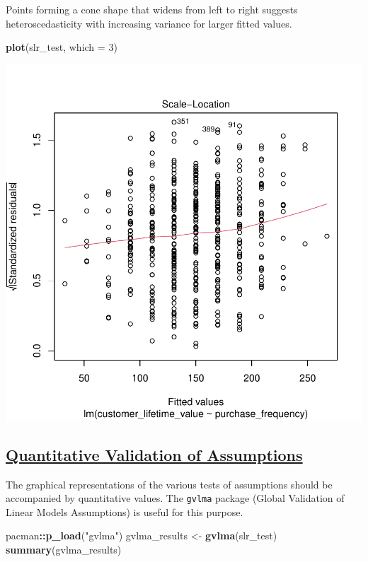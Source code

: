 \documentclass[
]{article}
\newenvironment{Shaded}{\begin{snugshade}}{\end{snugshade}}
\newcommand{\AttributeTok}[1]{\textcolor[rgb]{0.13,0.29,0.53}{#1}}
\newcommand{\DecValTok}[1]{\textcolor[rgb]{0.00,0.00,0.81}{#1}}
\newcommand{\FunctionTok}[1]{\textcolor[rgb]{0.13,0.29,0.53}{\textbf{#1}}}
\newcommand{\NormalTok}[1]{#1}
\newcommand{\OtherTok}[1]{\textcolor[rgb]{0.56,0.35,0.01}{#1}}
\newcommand{\SpecialCharTok}[1]{\textcolor[rgb]{0.81,0.36,0.00}{\textbf{#1}}}
\newcommand{\StringTok}[1]{\textcolor[rgb]{0.31,0.60,0.02}{#1}}
\begin{document}
Points forming a cone shape that widens from left to right suggests
heteroscedasticity with increasing variance for larger fitted values.

\begin{Shaded}
\begin{Highlighting}[]
\FunctionTok{plot}\NormalTok{(slr\_test, }\AttributeTok{which =} \DecValTok{3}\NormalTok{)}
\end{Highlighting}
\end{Shaded}

\includegraphics{1_simple_linear_regression_files/figure-latex/test_of_homoscedasticity-1.pdf}

\subsection{\texorpdfstring{\ul{\textbf{Quantitative Validation of
Assumptions}}}{Quantitative Validation of Assumptions}}\label{quantitative-validation-of-assumptions}

The graphical representations of the various tests of assumptions should
be accompanied by quantitative values. The \texttt{gvlma} package
(Global Validation of Linear Models Assumptions) is useful for this
purpose.

\begin{Shaded}
\begin{Highlighting}[]
\NormalTok{pacman}\SpecialCharTok{::}\FunctionTok{p\_load}\NormalTok{(}\StringTok{"gvlma"}\NormalTok{)}
\NormalTok{gvlma\_results }\OtherTok{\textless{}{-}} \FunctionTok{gvlma}\NormalTok{(slr\_test)}
\FunctionTok{summary}\NormalTok{(gvlma\_results)}
\end{Highlighting}
\end{Shaded}
\end{document}
